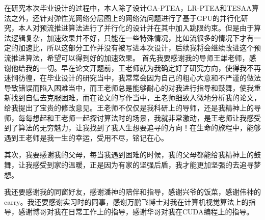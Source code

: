\documentclass[master]{thesis-uestc}
\begin{document}
在研究本次毕业设计的过程中，本人除了设计GA-PTEA，LR-PTEA和TESAA算法之外，还针对弹性光网络分层图上的网络流问题进行了基于GPU的并行化研究，本人对预流推进算法进行了并行化的设计并在其中加入跳限约束。但是由于算法逻辑复杂，加速效果并不好，只能在一些特殊情况，比如流很多的情况下才有一定的加速比，所以这部分工作并没有被写进本次设计，后续我将会继续改进这个预流推进算法，希望可以得到好的加速效果。
\thesisacknowledgement
首先我要感谢我的导师王雄老师，感谢他给我的一切。早在论文开题前，王老师就为我确定好了研究方向，使得我不再迷惘彷徨，在毕业设计的研究当中，我常常会因为自己的粗心大意和不严谨的做法导致错误而陷入困难当中，而王老师总是能够耐心的对我进行指导和鼓舞，使我重新找到自信去克服困难，而在论文的写作当中，王老师细致入微地分析我的论文，给我提出了宝贵的修改意见。王老师不仅仅是我科研上的导师，还是我精神上的导师，每每想起和王老师一起探讨算法时的场景，我就非常激动，是王老师让我感受到了算法的无穷魅力，让我找到了我人生想要追寻的方向！在生命的旅程中，能够遇到王老师是我一生的幸运，受用不尽，铭记在心。

其次，我要感谢我的父母，每当我遇到困难的时候，我的父母都能给我精神上的鼓舞，让我感受到家的温暖，正是因为有家的坚强后盾，我才能更加坚强的去追寻梦想。

我还要感谢我的同窗好友，感谢潘神的陪伴和指导，感谢兴爷的饭菜，感谢伟神的carry。我还要感谢实习时的同事，感谢万鹏飞博士对我在计算机视觉算法上的指导，感谢博哥对我在日常工作上的指导，感谢华哥对我在CUDA编程上的指导。
\end{document}
